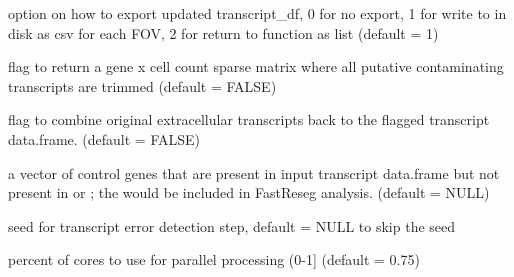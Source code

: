 \documentclass[letterpaper]{book}
\begin{document}
\begin{Arguments}
\begin{ldescription}
\item[\code{transDF\_export\_option}] option on how to export updated transcript\_df, 0 for no export, 1 for write to  in disk as csv for each FOV, 2 for return to function as list (default = 1)

\item[\code{return\_trimmed\_perCell}] flag to return a gene x cell count sparse matrix where all putative contaminating transcripts are trimmed (default = FALSE)

\item[\code{combine\_extra}] flag to combine original extracellular transcripts back to the flagged transcript data.frame. (default = FALSE)

\item[\code{ctrl\_genes}] a vector of control genes that are present in input transcript data.frame but not present in  or ; the  would be included in FastReseg analysis. (default = NULL)

\item[\code{seed\_transError}] seed for transcript error detection step, default = NULL to skip the seed

\item[\code{percentCores}] percent of cores to use for parallel processing (0-1] (default = 0.75)
\end{ldescription}
\end{Arguments}
%
\end{document}
